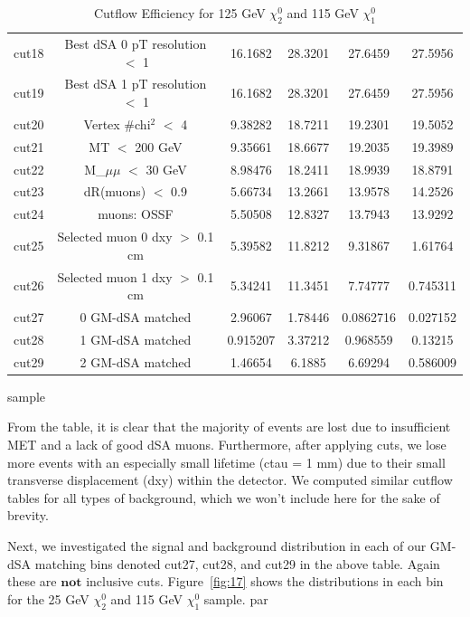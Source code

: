 \documentclass{article}
\begin{document}
\begin{table}[H]
\begin{tabular}{||c|c|c|c|c|c||}
            cut18 & Best dSA 0 pT resolution $<$ 1 & 16.1682 & 28.3201 & 27.6459 & 27.5956 \\
            cut19 & Best dSA 1 pT resolution $<$ 1 & 16.1682 & 28.3201 & 27.6459 & 27.5956 \\
            cut20 & Vertex #chi$^{2}$ $<$ 4 & 9.38282 & 18.7211 & 19.2301 & 19.5052 \\
            cut21 & MT $<$ 200 GeV & 9.35661 & 18.6677 & 19.2035 & 19.3989 \\
            cut22 & M_{$\mu\mu$} $<$ 30 GeV & 8.98476 & 18.2411 & 18.9939 & 18.8791 \\
            cut23 & dR(muons) $<$ 0.9 & 5.66734 & 13.2661 & 13.9578 & 14.2526 \\
            cut24 & muons: OSSF & 5.50508 & 12.8327 & 13.7943 & 13.9292 \\
            cut25 & Selected muon 0 dxy $>$ 0.1 cm & 5.39582 & 11.8212 & 9.31867 & 1.61764 \\
            cut26 & Selected muon 1 dxy $>$ 0.1 cm & 5.34241 & 11.3451 & 7.74777 & 0.745311 \\
            cut27 & 0 GM-dSA matched & 2.96067 & 1.78446 & 0.0862716 & 0.027152 \\
            cut28 & 1 GM-dSA matched & 0.915207 & 3.37212 & 0.968559 & 0.13215 \\
            cut29 & 2 GM-dSA matched & 1.46654 & 6.1885 & 6.69294 & 0.586009 \\
            \hline
        \end{tabular}
        \caption{Cutflow Efficiency for 125 GeV $\chi_{2}^{0}$ and 115 GeV $\chi_{1}^{0}$} sample
        \label{table:4}
    \end{table}
From the table, it is clear that the majority of events are lost due to insufficient MET and a lack of good dSA muons. Furthermore, after applying cuts, we lose more events with an especially small lifetime (ctau = 1 mm) due to their small transverse displacement (dxy) within the detector. We computed similar cutflow tables for all types of background, which we won't include here for the sake of brevity.
\par
Next, we investigated the signal and background distribution in each of our GM-dSA matching bins denoted cut27, cut28, and cut29 in the above table. Again these are $\textbf{not}$ inclusive cuts. Figure~\ref{fig:17} shows the distributions in each bin for the 25 GeV $\chi_{2}^{0}$ and 115 GeV $\chi_{1}^{0}$ sample.
par
\end{document}
